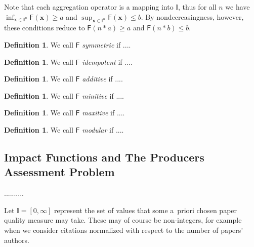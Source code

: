 \documentclass[11pt]{article}\usepackage{graphicx, color}
\renewcommand{\emph}[1]{\textsl{#1}}
\newcommand{\vect}[1]{{\mathbf{#1}}}
\newcommand{\func}[1]{{\mathsf{#1}}}
\newcommand{\Ival}{\mathbb{I}}
\newcommand{\IvalPow}[1]{\mathbb{I}^{#1}}
\theoremstyle{remark}
\theoremstyle{definition}
\newtheorem{definition}[theorem]{Definition}
\begin{document}
Note that each aggregation operator is a mapping into $\Ival$,
thus for all $n$ we have $\inf_{\vect{x}\in\IvalPow{n}} \func{F}(\vect{x}) \ge a$
and $\sup_{\vect{x}\in\IvalPow{n}} \func{F}(\vect{x}) \le b$.
By nondecreasingness, however, these conditions reduce to
$\func{F}(n\ast a)\ge a$ and $\func{F}(n\ast b)\le b$.

\begin{definition}
We call $\func{F}$ \emph{symmetric} if ....
\end{definition}



\begin{definition}
We call $\func{F}$ \emph{idempotent} if ....
\end{definition}


\begin{definition}
We call $\func{F}$ \emph{additive} if ....
\end{definition}



\begin{definition}
We call $\func{F}$ \emph{minitive} if ....
\end{definition}



\begin{definition}
We call $\func{F}$ \emph{maxitive} if ....
\end{definition}



\begin{definition}
We call $\func{F}$ \emph{modular} if ....
\end{definition}



\subsection{Impact Functions and The Producers Assessment Problem}

..........

Let $\Ival=[0,\infty]$ represent the set of values that some a~priori chosen
paper quality measure may take. These may of course be non-integers,
for example when we consider citations normalized with respect
to the number of papers' authors.
\end{document}
